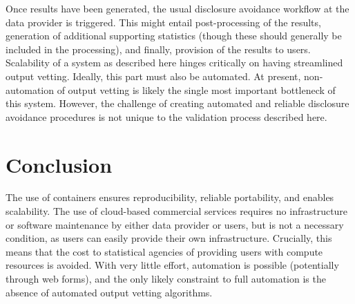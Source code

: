 \documentclass[12pt]{article}
\providecommand{\DIFaddbegin}{} %
\newcommand{\DIFaddincludegraphics}[2][]{{\color{blue}\fbox{\DIFOincludegraphics[#1]{#2}}}} %
\DeclareRobustCommand{\DIFaddbegin}{\DIFOaddbegin \let\includegraphics\DIFaddincludegraphics} %
\begin{document}

Once results have been generated, the usual disclosure avoidance workflow at the data provider is triggered. This might entail post-processing of the results, generation of additional supporting statistics (though these should generally be included in the processing), and finally, provision of the results to users. 
%
Scalability of a system as described here hinges critically on having streamlined output vetting. Ideally, this  part must also be automated. At present, non-automation of output vetting is likely the single most important bottleneck of this system. However, the challenge of creating automated and reliable disclosure avoidance procedures is  not unique to the validation process described here.


\section{Conclusion}

The use of containers ensures reproducibility, reliable portability, and enables scalability. The use of cloud-based commercial services requires no infrastructure or software maintenance by either data provider or users, but is not a necessary condition, as users can easily provide their own infrastructure. Crucially, this means that the cost to statistical agencies of providing users with compute resources is avoided. With very little effort, automation is possible (potentially through web forms), and the only likely constraint to full automation is the absence of automated output vetting algorithms. 
\DIFaddbegin 
\end{document}
